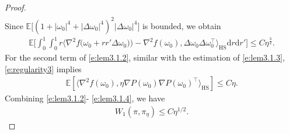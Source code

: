 \documentclass[12pt]{amsart}
\theoremstyle{definition}
\theoremstyle{remark}
\numberwithin{equation}{section}
\newcommand{\dif}{\mathrm{d}}
\newcommand{\E}{\mathbb{E}}            %
\newcommand{\Ll}{\langle}
\newcommand{\Rr}{\rangle}
\begin{document}
\begin{proof}
\begin{eqnarray*}
\end{eqnarray*}
Since $\E\big[(1+|\omega_0|^4+|\Delta\omega_0|^4)^2|\Delta\omega_0|^4\big]$ is bounded, we obtain
\begin{eqnarray}\label{e:lem3.1.3}
	\E\big[\int_0^1\int_0^1 r\Ll \nabla^2f\big(\omega_0+rr'\Delta\omega_0)\big)-\nabla^2f(\omega_0),\Delta\omega_0\Delta\omega_0^\top    \Rr_{\text {HS}}\dif r\dif r'\big]
	\le C\eta^{\frac32}.
\end{eqnarray}
For the second term of \eqref{e:lem3.1.2}, similar with the estimation of \eqref{e:lem3.1.3}, \eqref{e:regularity3} implies
\begin{eqnarray}\label{e:lem3.1.4}
\E[\Ll  \nabla^2f(\omega_0),\eta\nabla P(\omega_0)\nabla P(\omega_0)^\top
\Rr_{\text{HS}}]\le C\eta.
\end{eqnarray}
Combining \eqref{e:lem3.1.2}- \eqref{e:lem3.1.4}, we have
\begin{eqnarray*}
W_1(\pi,\pi_\eta)\le C\eta^{1/2}.
\end{eqnarray*}
\end{proof}
\end{document}
